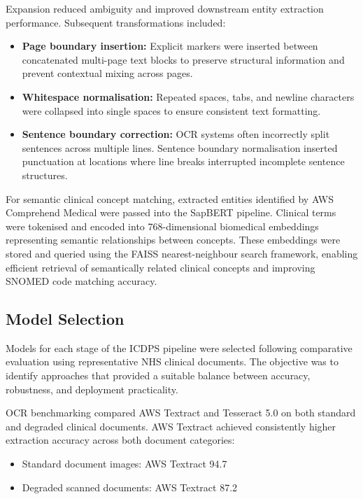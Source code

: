 Expansion reduced ambiguity and improved downstream entity extraction performance. Subsequent transformations included:
\begin{itemize}
    \item \textbf{Page boundary insertion:} Explicit markers were inserted between concatenated multi-page text blocks to preserve structural information and prevent contextual mixing across pages.
    \item \textbf{Whitespace normalisation:} Repeated spaces, tabs, and newline characters were collapsed into single spaces to ensure consistent text formatting.
    \item \textbf{Sentence boundary correction:} OCR systems often incorrectly split sentences across multiple lines. Sentence boundary normalisation inserted punctuation at locations where line breaks interrupted incomplete sentence structures.
\end{itemize}

For semantic clinical concept matching, extracted entities identified by AWS Comprehend Medical were passed into the SapBERT pipeline. Clinical terms were tokenised and encoded into 768-dimensional biomedical embeddings representing semantic relationships between concepts. These embeddings were stored and queried using the FAISS nearest-neighbour search framework, enabling efficient retrieval of semantically related clinical concepts and improving SNOMED code matching accuracy.

\subsection{Model Selection}

Models for each stage of the ICDPS pipeline were selected following comparative evaluation using representative NHS clinical documents. The objective was to identify approaches that provided a suitable balance between accuracy, robustness, and deployment practicality.

OCR benchmarking compared AWS Textract and Tesseract 5.0 on both standard and degraded clinical documents. AWS Textract achieved consistently higher extraction accuracy across both document categories:

\begin{itemize}
\item Standard document images: AWS Textract 94.7%
\item Degraded scanned documents: AWS Textract 87.2%
\end{itemize}

